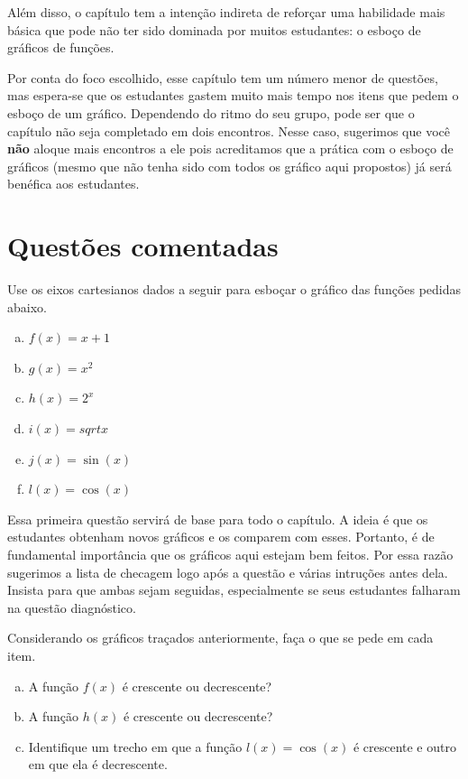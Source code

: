 \documentclass[main_estudante.tex]{subfiles}
\begin{document}
Além disso, o capítulo tem a intenção indireta de reforçar uma habilidade mais básica que pode não ter sido dominada por muitos estudantes: o esboço de gráficos de funções.

Por conta do foco escolhido, esse capítulo tem um número menor de questões, mas espera-se que os estudantes gastem muito mais tempo nos itens que pedem o esboço de um gráfico. Dependendo do ritmo do seu grupo, pode ser que o capítulo não seja completado em dois encontros. Nesse caso, sugerimos que você \textbf{não} aloque mais encontros a ele pois acreditamos que a prática com o esboço de gráficos (mesmo que não tenha sido com todos os gráfico aqui propostos) já será benéfica aos estudantes.

\section{Questões comentadas}

\begin{questao}
Use os eixos cartesianos dados a seguir para  esboçar o gráfico das funções pedidas abaixo.
\begin{enumerate}[a)]
\item $f(x)=x+1$
\item $g(x)=x^2$
\item $h(x)=2^x$
\item $i(x)=sqrt{x}$
\item $j(x)=\sin(x)$
\item $l(x)=\cos(x)$
\end{enumerate}
\end{questao}

Essa primeira questão servirá de base para todo o capítulo. A ideia é que os estudantes obtenham novos gráficos e os comparem com esses. Portanto, é de fundamental importância que os gráficos aqui estejam bem feitos. Por essa razão sugerimos a lista de checagem logo após a questão e várias intruções antes dela. Insista para que ambas sejam seguidas, especialmente se seus estudantes falharam na questão diagnóstico.

\begin{questao}
Considerando os gráficos traçados anteriormente, faça o que se pede em cada item.
\begin{enumerate}[a)]
\item A função $f(x)$ é crescente ou decrescente?
\item A função $h(x)$ é crescente ou decrescente?
\item Identifique um trecho em que a função $l(x)=\cos(x)$ é crescente e outro em que ela é decrescente.
\end{enumerate}
\end{questao}
\end{document}
